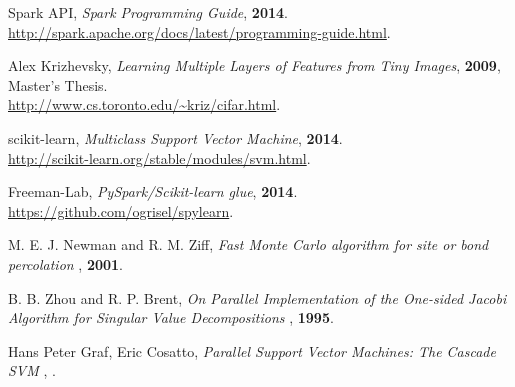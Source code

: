 \documentclass[a4paper]{article}
\begin{document}
\begin{thebibliography}{}

 Spark API, \emph{Spark Programming Guide}, \textbf{2014}.\\
\url{http://spark.apache.org/docs/latest/programming-guide.html}.

 Alex Krizhevsky, \emph{Learning Multiple Layers of Features from Tiny Images}, \textbf{2009}, Master's Thesis.\\
\url{http://www.cs.toronto.edu/~kriz/cifar.html}.

 scikit-learn, \emph{Multiclass Support Vector Machine}, \textbf{2014}.\\
\url{http://scikit-learn.org/stable/modules/svm.html}.

 Freeman-Lab, \emph{PySpark/Scikit-learn glue}, \textbf{2014}.\\
\url{https://github.com/ogrisel/spylearn}.

 M. E. J. Newman and R. M. Ziff, \emph{Fast Monte Carlo algorithm for site or bond percolation
}, \textbf{2001}.

 B. B. Zhou and R. P. Brent, \emph{On Parallel Implementation of the One-sided Jacobi Algorithm for Singular Value Decompositions
}, \textbf{1995}.

 Hans Peter Graf, Eric Cosatto, \emph{Parallel Support Vector Machines: The Cascade SVM
}, \textbf{}.
\end{thebibliography}
\end{document}
